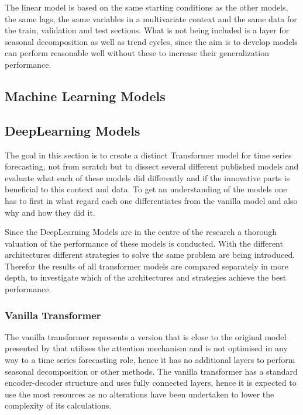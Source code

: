 \documentclass{article}
\begin{document}
The linear model is based on the same starting conditions as the other models, the same lags, the same variables in a multivariate context and the same data for the train, validation and test sections. What is not being included is a layer for seasonal decomposition as well as trend cycles, since the aim is to develop models can perform reasonable well without these to increase their generalization performance. 

\subsection{Machine Learning Models}


\subsection{DeepLearning Models}

The goal in this section is to create a distinct Transformer model for time series forecasting, not from scratch but to dissect several different published models and evaluate what each of these models did differently and if the innovative parts is beneficial to this context and data. To get an understanding of the models one has to first in what regard each one differentiates from the vanilla model and also why and how they did it. \par 
Since the DeepLearning Models are in the centre of the research a thorough valuation of the performance of these models is conducted. With the different architectures different strategies to solve the same problem are being introduced. Therefor the results of all transformer models are compared separately in more depth, to investigate which of the architectures and strategies achieve the best performance. 

\subsubsection{Vanilla Transformer}

The vanilla transformer represents a version that is close to the original model presented by \cite{vanilla-transformer} that utilises the attention mechanism and is not optimised in any way to a time series forecasting role, hence it has no additional layers to perform seasonal decomposition or other methods.
The vanilla transformer has a standard encoder-decoder structure and uses fully connected layers, hence it is expected to use the most resources as no alterations have been undertaken to lower the complexity of its calculations. 
\end{document}
